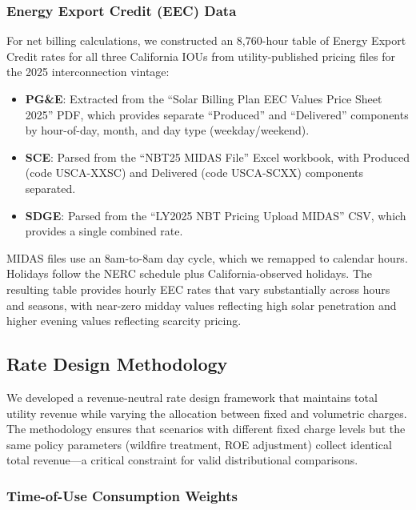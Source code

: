\documentclass[12pt]{article}
\begin{document}
\subsubsection{Energy Export Credit (EEC) Data}
\label{sec:eec_data}

For net billing calculations, we constructed an 8,760-hour table of Energy Export Credit rates for all three California IOUs from utility-published pricing files for the 2025 interconnection vintage:
\begin{itemize}
    \item \textbf{PG\&E}: Extracted from the ``Solar Billing Plan EEC Values Price Sheet 2025'' PDF, which provides separate ``Produced'' and ``Delivered'' components by hour-of-day, month, and day type (weekday/weekend).
    \item \textbf{SCE}: Parsed from the ``NBT25 MIDAS File'' Excel workbook, with Produced (code USCA-XXSC) and Delivered (code USCA-SCXX) components separated.
    \item \textbf{SDGE}: Parsed from the ``LY2025 NBT Pricing Upload MIDAS'' CSV, which provides a single combined rate.
\end{itemize}
MIDAS files use an 8am-to-8am day cycle, which we remapped to calendar hours. Holidays follow the NERC schedule plus California-observed holidays. The resulting table provides hourly EEC rates that vary substantially across hours and seasons, with near-zero midday values reflecting high solar penetration and higher evening values reflecting scarcity pricing.

\subsection{Rate Design Methodology}

We developed a revenue-neutral rate design framework that maintains total utility revenue while varying the allocation between fixed and volumetric charges. The methodology ensures that scenarios with different fixed charge levels but the same policy parameters (wildfire treatment, ROE adjustment) collect identical total revenue---a critical constraint for valid distributional comparisons.

\subsubsection{Time-of-Use Consumption Weights}
\end{document}
